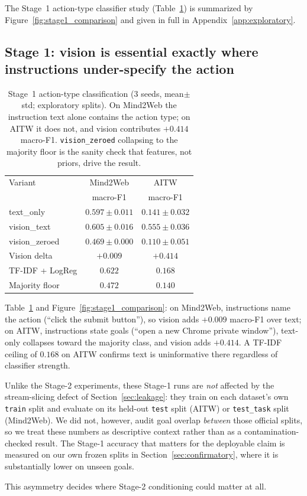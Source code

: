 \newcommand{\expstageone}{%
\subsection{Stage 1: vision is essential exactly where instructions
under-specify the action}

\begin{table}[tb]
\begin{center}
\small
\begin{tabular}{lcc}
\toprule
Variant & Mind2Web & AITW \\
 & macro-F1 & macro-F1 \\
\midrule
text\_only & $0.597 \pm 0.011$ & $0.141 \pm 0.032$ \\
vision\_text & $\mathbf{0.605 \pm 0.016}$ & $\mathbf{0.555 \pm 0.036}$ \\
vision\_zeroed & $0.469 \pm 0.000$ & $0.110 \pm 0.051$ \\
\midrule
Vision delta & $+0.009$ & $+0.414$ \\
TF-IDF + LogReg & $0.622$ & $0.168$ \\
Majority floor & $0.472$ & $0.140$ \\
\bottomrule
\end{tabular}
\end{center}
\caption{Stage~1 action-type classification (3 seeds, mean$\pm$std;
exploratory splits). On Mind2Web the instruction text alone contains the
action type; on AITW it does not, and vision contributes $+0.414$
macro-F1. \texttt{vision\_zeroed} collapsing to the majority floor is the
sanity check that features, not priors, drive the result.}
\label{tab:stage1}
\end{table}

Table~\ref{tab:stage1} and Figure~\ref{fig:stage1_comparison}: on
Mind2Web, instructions name the action (``click the submit button''), so
vision adds $+0.009$ macro-F1 over text; on AITW, instructions state goals
(``open a new Chrome private window''), text-only collapses toward the
majority class, and vision adds $+0.414$. A TF-IDF ceiling of $0.168$ on
AITW confirms text is uninformative there regardless of classifier
strength.

Unlike the Stage-2 experiments, these Stage-1 runs are \emph{not} affected
by the stream-slicing defect of Section~\ref{sec:leakage}: they train on
each dataset's own \texttt{train} split and evaluate on its held-out
\texttt{test} split (AITW) or \texttt{test\_task} split (Mind2Web). We did
not, however, audit goal overlap \emph{between} those official splits, so
we treat these numbers as descriptive context rather than as a
contamination-checked result. The Stage-1 accuracy that matters for the
deployable claim is measured on our own frozen splits in
Section~\ref{sec:confirmatory}, where it is substantially lower on unseen
goals.

This asymmetry decides where Stage-2 conditioning could matter
at all.

}
\ifworkshopbuild The Stage~1 action-type classifier study (Table~\ref{tab:stage1}) is
summarized by Figure~\ref{fig:stage1_comparison} and given in full in
Appendix~\ref{app:exploratory}.
\else\expstageone\fi


